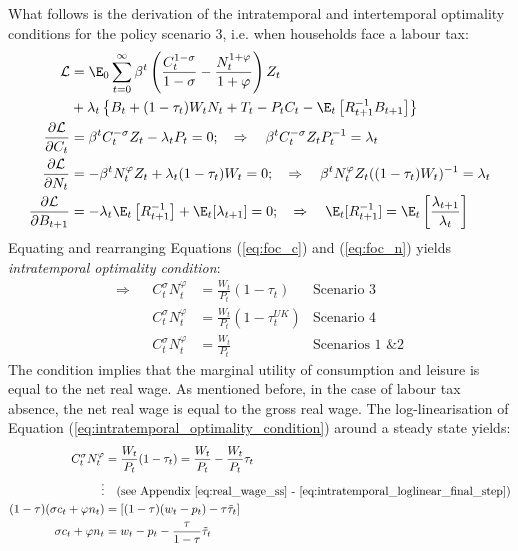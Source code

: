 What follows is the derivation of the intratemporal and intertemporal optimality conditions for the policy scenario 3, i.e. when households face a labour tax:
\begin{align}
    \mathcal{L} & = \E_0 \sum^{\infty}_{t=0} \beta^t \left( \frac{C_t^{1-\sigma}}{1-\sigma} - \frac{N_t^{1+\varphi}}{1+\varphi} \right)Z_t  \nonumber \\ &+ \lambda_t\left\{  B_t + (1-\tau_t) W_t N_t + T_t - P_t C_t - \E_t \left[R^{-1}_{t+1}B_{t+1} \right] \right\}\\
    \frac{\partial \mathcal{L}}{\partial C_t}                                    & = \beta^t C_t^{-\sigma}Z_t - \lambda_t P_t = 0; \quad \Rightarrow \quad \beta^t C_t^{-\sigma}Z_t P_{t}^{-1} = \lambda_t \label{eq:foc_c} \\
    \frac{\partial \mathcal{L}}{\partial N_t}                                    & = -\beta^t N_t^{\varphi}Z_t + \lambda_t (1-\tau_t) W_t = 0; \quad \Rightarrow \quad \beta^t N_t^{\varphi} Z_t ((1-\tau_t)W_{t})^{-1} = \lambda_t \label{eq:foc_n} \\
    \frac{\partial \mathcal{L}}{\partial B_{t+1}} & = -\lambda_t \E_t \left[ R^{-1}_{t+1}  \right] + \E_t[\lambda_{t+1}] = 0; \quad \Rightarrow \quad \E_t[R^{-1}_{t+1}] = \E_t \left[\frac{\lambda_{t+1}}{\lambda_t}\right] \label{eq:foc_b}
\end{align}
Equating and rearranging Equations (\ref{eq:foc_c}) and (\ref{eq:foc_n}) yields \textit{intratemporal optimality condition}:
\begin{align*}
    \Rightarrow &  & C_t^{\sigma} N_t^{\varphi} &=  \frac{W_t}{P_t}(1-\tau_t) \label{eq:intratemporal_optimality_condition} &  \text{Scenario 3} \\
    & & C_t^{\sigma} N_t^{\varphi} &=  \frac{W_t}{P_t}(1-\tau^{UK}_t) & \text{Scenario 4} \\
    & & C_t^{\sigma} N_t^{\varphi} &=  \frac{W_t}{P_t} & \text{Scenarios 1 \& 2}
\end{align*}
The condition implies that the marginal utility of consumption and leisure is equal to the net real wage. As mentioned before, in the case of labour tax absence, the net real wage is equal to the gross real wage. The log-linearisation of Equation (\ref{eq:intratemporal_optimality_condition}) around a steady state yields:
\begin{align}
    C_t^\sigma N_t^\varphi &= \frac{W_t}{P_t}(1-\tau_t) = \frac{W_t}{P_t} - \frac{W_t}{P_t}\tau_t \nonumber\\
    \vdots & \quad \text{(see Appendix \ref{eq:real_wage_ss} - \ref{eq:intratemporal_loglinear_final_step})}\nonumber\\
    (1-\tau)({\sigma c_t + \varphi n_t})  &= \left[(1-\tau)({w_t - p_t}) - \tau \tilde{\tau}_t\right]\nonumber\\
    {\sigma c_t + \varphi n_t}  &= {w_t - p_t} - \frac{\tau}{1-\tau}\tilde{\tau}_t
\end{align}
